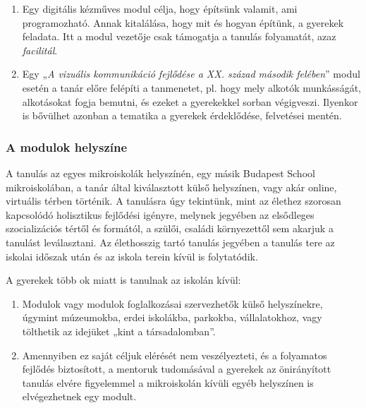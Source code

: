 \begin{enumerate}
      \item Egy digitális kézműves modul célja, hogy építsünk valamit, ami
            programozható. Annak kitalálása, hogy mit és hogyan építünk, a
            gyerekek
            feladata. Itt a modul vezetője csak támogatja a tanulás folyamatát,
            azaz
            \emph{facilitál}.

      \item Egy „\emph{A vizuális kommunikáció fejlődése a XX. század második
                  felében}''
            modul esetén a tanár előre felépíti a tanmenetet, pl. hogy mely
            alkotók munkásságát,
            alkotásokat
            fogja bemutni, és
            ezeket a gyerekekkel sorban végigveszi. Ilyenkor is bővülhet
            azonban a tematika a gyerekek érdeklődése, felvetései mentén.

\end{enumerate}

\subsubsection{A modulok helyszíne}

A tanulás az egyes mikroiskolák helyszínén, egy másik Budapest School
mikroiskolában, a tanár által kiválasztott külső helyszínen,
vagy akár online, virtuális térben történik. A tanulásra úgy tekintünk, mint az
élethez szorosan kapcsolódó holisztikus fejlődési igényre,
melynek jegyében az elsődleges szocializációs tértől és formától, a szülői,
családi környezettől sem akarjuk a tanulást leválasztani. Az élethosszig
tartó tanulás jegyében a tanulás tere az iskolai időszak után és az
iskola terein kívül is folytatódik.

A gyerekek több ok miatt is tanulnak az iskolán kívül:

\begin{enumerate}
      \item Modulok vagy modulok foglalkozásai szervezhetők külső helyszínekre,
            úgymint múzeumokba, erdei
            iskolákba, parkokba, vállalatokhoz, vagy tölthetik az idejüket
            „kint a
            társadalomban''.

      \item Amennyiben ez saját céljuk elérését nem veszélyezteti, és a
            folyamatos fejlődés biztosított, a mentoruk tudomásával a gyerekek
            az
            önirányított tanulás elvére figyelemmel a mikroiskolán kívüli egyéb
            helyszínen
            is elvégezhetnek egy modult.
\end{enumerate}


